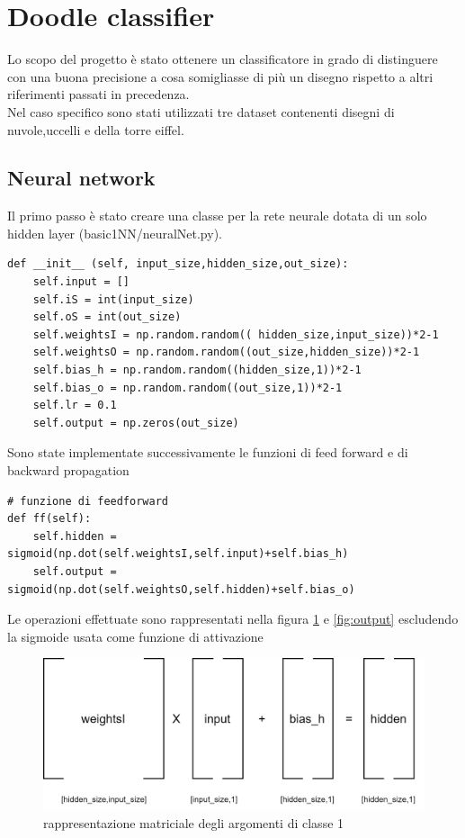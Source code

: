 \documentclass[12pt]{article}
\begin{document}
\section{Doodle classifier}
Lo scopo del progetto è stato ottenere un classificatore in grado di distinguere con una buona precisione a cosa somigliasse di più un disegno rispetto a altri riferimenti passati in precedenza.\\
Nel caso specifico sono stati utilizzati tre dataset contenenti disegni di nuvole,uccelli e della torre eiffel.
\subsection{Neural network}
Il primo passo è stato creare una classe per la rete neurale dotata di un solo hidden layer (basic1NN/neuralNet.py). 
\begin{lstlisting}[language=myPython]
 def __init__ (self, input_size,hidden_size,out_size):
	self.input = []
	self.iS = int(input_size)
	self.oS = int(out_size)	
	self.weightsI = np.random.random(( hidden_size,input_size))*2-1
	self.weightsO = np.random.random((out_size,hidden_size))*2-1
	self.bias_h = np.random.random((hidden_size,1))*2-1
	self.bias_o = np.random.random((out_size,1))*2-1
	self.lr = 0.1
	self.output = np.zeros(out_size)
\end{lstlisting}
\newpage
Sono state implementate successivamente le funzioni di feed forward e di backward propagation
\begin{lstlisting}[language=myPython]
# funzione di feedforward
def ff(self): 
	self.hidden = sigmoid(np.dot(self.weightsI,self.input)+self.bias_h)
	self.output = sigmoid(np.dot(self.weightsO,self.hidden)+self.bias_o)
\end{lstlisting}
Le operazioni effettuate sono rappresentati nella figura \ref{fig:hidden} e \ref{fig:output} escludendo la sigmoide usata come funzione di attivazione
\begin{figure}[h!]
	\centering
	\includegraphics[width=10 cm]{resources/hidden.png}
	\caption{rappresentazione matriciale degli argomenti di classe 1}
	\label{fig:hidden}
\end{figure}
\end{document}
